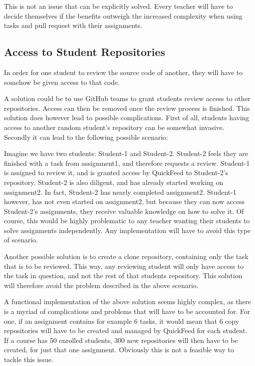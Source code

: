 This is not an issue that can be explicitly solved.
Every teacher will have to decide themselves if the benefits outweigh the increased complexity when using tasks and pull request with their assignments.

\subsection{Access to Student Repositories}

In order for one student to review the source code of another, they will have to somehow be given access to that code.

A solution could be to use GitHub teams to grant students review access to other repositories.
Access can then be removed once the review process is finished.
This solution does however lead to possible complications.
First of all, students having access to another random student's repository can be somewhat invasive.
Secondly it can lead to the following possible scenario:

Imagine we have two students: Student-1 and Student-2.
Student-2 feels they are finished with a task from assignment1, and therefore requests a review.
Student-1 is assigned to review it, and is granted access by QuickFeed to Student-2's repository.
Student-2 is also diligent, and has already started working on assignment2.
In fact, Student-2 has nearly completed assignment2.
Student-1 however, has not even started on assignment2, but because they can now access Student-2's assignments, they receive valuable knowledge on how to solve it.
Of course, this would be highly problematic to any teacher wanting their students to solve assignments independently.
Any implementation will have to avoid this type of scenario.

Another possible solution is to create a clone repository, containing only the task that is to be reviewed. 
This way, any reviewing student will only have access to the task in question, and not the rest of that students repository.
This solution will therefore avoid the problem described in the above scenario.

A functional implementation of the above solution seems highly complex, as there is a myriad of complications and problems that will have to be accounted for.
For one, if an assignment contains for example 6 tasks, it would mean that 6 copy repositories will have to be created and managed by QuickFeed for each student.
If a course has 50 enrolled students, 300 new repositories will then have to be created, for just that one assignment.
Obviously this is not a feasible way to tackle this issue.

